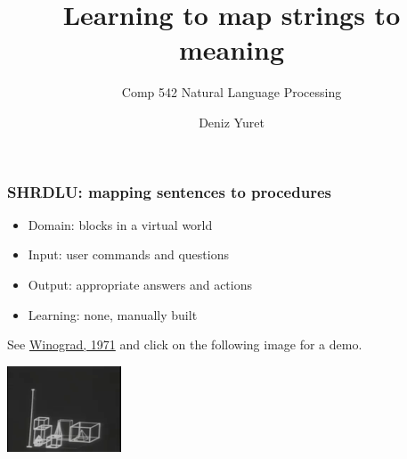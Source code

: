 \documentclass[ignorenonframetext]{beamer}
\title{Learning to map strings to meaning}
\subtitle{Comp 542 Natural Language Processing}
\author{Deniz Yuret}
\begin{document}
\begin{frame}
\maketitle
\end{frame}

\begin{frame}\frametitle{SHRDLU: mapping sentences to procedures}

\begin{itemize}
\item Domain: blocks in a virtual world
\item Input: user commands and questions
\item Output: appropriate answers and actions
\item Learning: none, manually built
\end{itemize}

See \href{http://hci.stanford.edu/~winograd/shrdlu}{Winograd, 1971}
and click on the following image for a demo.

\begin{center}
\href{http://youtu.be/QAJz4YKUwqw}{
\includegraphics[]{images/winograd-shrdlu.png}}
\end{center}

\end{frame}
\end{document}
